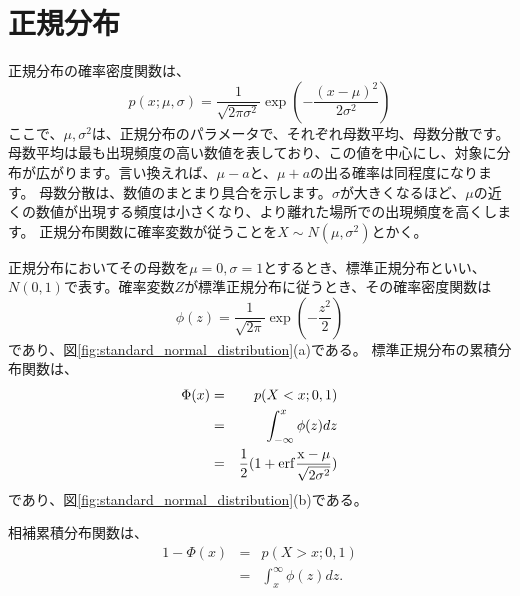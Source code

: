 \section{正規分布}
正規分布の確率密度関数は、
\begin{equation}
p(x;\mu,\sigma)=\frac{1}{\sqrt{2\pi\sigma^2}}\exp\left(-\frac{(x-\mu)^2}{2\sigma^2} \right)
\end{equation}
ここで、$\mu,\sigma^2$は、正規分布のパラメータで、それぞれ母数平均、母数分散です。
母数平均は最も出現頻度の高い数値を表しており、この値を中心にし、対象に分布が広がります。言い換えれば、$\mu-a$と、$\mu+a$の出る確率は同程度になります。
母数分散は、数値のまとまり具合を示します。$\sigma$が大きくなるほど、$\mu$の近くの数値が出現する頻度は小さくなり、より離れた場所での出現頻度を高くします。
正規分布関数に確率変数が従うことを$X\sim N(\mu,\sigma^2)$とかく。



正規分布においてその母数を$\mu=0,\sigma=1$とするとき、標準正規分布といい、$N(0,1)$で表す。確率変数$Z$が標準正規分布に従うとき、その確率密度関数は
\begin{equation}
\phi(z) = \frac{1}{\sqrt{2\pi}}\exp(-\frac{z^2}{2})
\end{equation}
であり、図\ref{fig:standard_normal_distribution}(a)である。
標準正規分布の累積分布関数は、
\begin{eqnarray}
\Phi(x) &=& p(X<x; 0,1) \\
    &=& \int_{-\infty}^x \phi(z)dz \\
    &=& \frac{1}{2}(1+\rm{erf}\frac{x-\mu}{\sqrt{2\sigma^2}})
\end{eqnarray}
であり、図\ref{fig:standard_normal_distribution}(b)である。

相補累積分布関数は、
\begin{eqnarray}
    1-\Phi(x) &=& p(X>x; 0,1) \\
        &=& \int_{x}^{\infty} \phi(z)dz.
\end{eqnarray}


